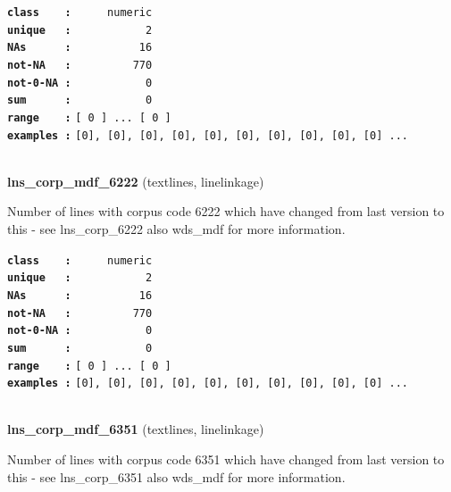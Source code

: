 \documentclass[]{article}
\begin{document}
\textbf{\texttt{class\ \ \ \ :}} \texttt{~~~~~numeric}\\
\textbf{\texttt{unique\ \ \ :}} \texttt{~~~~~~~~~~~2}\\
\textbf{\texttt{NAs\ \ \ \ \ \ :}} \texttt{~~~~~~~~~~16}\\
\textbf{\texttt{not-NA\ \ \ :}} \texttt{~~~~~~~~~770}\\
\textbf{\texttt{not-0-NA\ :}} \texttt{~~~~~~~~~~~0}\\
\textbf{\texttt{sum\ \ \ \ \ \ :}} \texttt{~~~~~~~~~~~0}\\
\textbf{\texttt{range\ \ \ \ :}}
\texttt{{[}\ 0\ {]}\ ...\ {[}\ 0\ {]}}\\
\textbf{\texttt{examples\ :}}
\texttt{{[}0{]},\ {[}0{]},\ {[}0{]},\ {[}0{]},\ {[}0{]},\ {[}0{]},\ {[}0{]},\ {[}0{]},\ {[}0{]},\ {[}0{]}\ ...}\\

~

\textbf{lns\_corp\_mdf\_6222} (textlines, linelinkage)

Number of lines with corpus code 6222 which have changed from last
version to this - see lns\_corp\_6222 also wds\_mdf for more
information.

\textbf{\texttt{class\ \ \ \ :}} \texttt{~~~~~numeric}\\
\textbf{\texttt{unique\ \ \ :}} \texttt{~~~~~~~~~~~2}\\
\textbf{\texttt{NAs\ \ \ \ \ \ :}} \texttt{~~~~~~~~~~16}\\
\textbf{\texttt{not-NA\ \ \ :}} \texttt{~~~~~~~~~770}\\
\textbf{\texttt{not-0-NA\ :}} \texttt{~~~~~~~~~~~0}\\
\textbf{\texttt{sum\ \ \ \ \ \ :}} \texttt{~~~~~~~~~~~0}\\
\textbf{\texttt{range\ \ \ \ :}}
\texttt{{[}\ 0\ {]}\ ...\ {[}\ 0\ {]}}\\
\textbf{\texttt{examples\ :}}
\texttt{{[}0{]},\ {[}0{]},\ {[}0{]},\ {[}0{]},\ {[}0{]},\ {[}0{]},\ {[}0{]},\ {[}0{]},\ {[}0{]},\ {[}0{]}\ ...}\\

~

\textbf{lns\_corp\_mdf\_6351} (textlines, linelinkage)

Number of lines with corpus code 6351 which have changed from last
version to this - see lns\_corp\_6351 also wds\_mdf for more
information.
\end{document}
